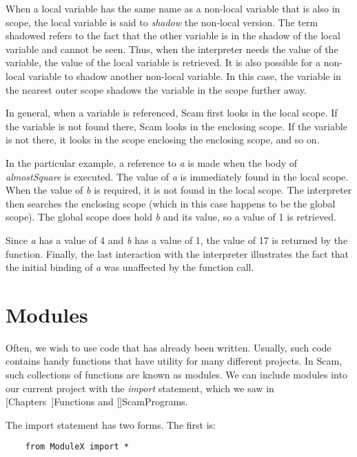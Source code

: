 When a local variable has the same name as a non-local variable
that is also in scope, the local variable is said to
{\it shadow} the non-local version. The term shadowed refers to the fact
that the other variable is in the shadow of the local
variable and cannot be seen. Thus, when the
interpreter needs the value of the variable, the value of
the local variable is retrieved.
It is also possible for a non-local variable to shadow
another non-local variable. In this case, the variable
in the nearest outer scope shadows the variable in
the scope further away.

In general, when a variable is referenced,
Scam first looks in the local
scope.
If the variable is not found there,
Scam looks in the enclosing scope.
If the variable is not there,
it looks in the scope enclosing the enclosing scope, 
and so on.

In the particular example,
a reference to {\it a} is made when the body of
{\it almostSquare} is executed. The value of {\it a}
is immediately found in the local scope.
When the value of {\it b} is required,
it is not found in the local scope. The interpreter
then searches the enclosing scope (which in this case happens
to be the global scope).
The global scope does hold {\it b} and its value, so a value
of 1 is retrieved.

Since {\it a} has a value of 4 and {\it b} has a value of 1, the
value of 17 is returned by the function. Finally, the
last interaction with the interpreter illustrates the
fact that the initial binding of {\it a} was unaffected by the
function call.

\section{Modules}

Often, we wish to use code that has already been written.
Usually, such code contains handy functions that have
utility for many different projects. In Scam, such
collections of functions are known as modules.
We can include modules into our current project with
the {\it import} statement, which we saw in
[Chapters~\Ref]{Functions}
and
[\Ref]{ScamPrograms}.

The import statement has two forms. The first is:

\begin{verbatim}
    from ModuleX import *
\end{verbatim}

